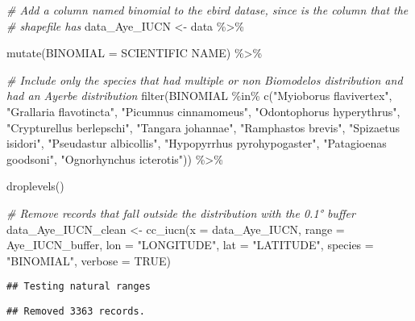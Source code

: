 \documentclass[
]{article}
\newenvironment{Shaded}{\begin{snugshade}}{\end{snugshade}}
\newcommand{\AttributeTok}[1]{\textcolor[rgb]{0.77,0.63,0.00}{#1}}
\newcommand{\CommentTok}[1]{\textcolor[rgb]{0.56,0.35,0.01}{\textit{#1}}}
\newcommand{\ConstantTok}[1]{\textcolor[rgb]{0.00,0.00,0.00}{#1}}
\newcommand{\FunctionTok}[1]{\textcolor[rgb]{0.00,0.00,0.00}{#1}}
\newcommand{\NormalTok}[1]{#1}
\newcommand{\OtherTok}[1]{\textcolor[rgb]{0.56,0.35,0.01}{#1}}
\newcommand{\SpecialCharTok}[1]{\textcolor[rgb]{0.00,0.00,0.00}{#1}}
\newcommand{\StringTok}[1]{\textcolor[rgb]{0.31,0.60,0.02}{#1}}
\begin{document}
\begin{Shaded}
\begin{Highlighting}[]
\CommentTok{\# Add a column named binomial to the ebird datase, since is the column that the }
\CommentTok{\# shapefile has }
\NormalTok{data\_Aye\_IUCN }\OtherTok{\textless{}{-}}\NormalTok{ data }\SpecialCharTok{\%\textgreater{}\%} 
  
  \FunctionTok{mutate}\NormalTok{(}\AttributeTok{BINOMIAL =} \StringTok{\textasciigrave{}}\AttributeTok{SCIENTIFIC NAME}\StringTok{\textasciigrave{}}\NormalTok{) }\SpecialCharTok{\%\textgreater{}\%}
  
  \CommentTok{\# Include only the species that had multiple or non Biomodelos distribution and had an Ayerbe distribution}
  \FunctionTok{filter}\NormalTok{(BINOMIAL }\SpecialCharTok{\%in\%} \FunctionTok{c}\NormalTok{(}\StringTok{"Myioborus flavivertex"}\NormalTok{, }\StringTok{"Grallaria flavotincta"}\NormalTok{, }\StringTok{"Picumnus cinnamomeus"}\NormalTok{, }\StringTok{"Odontophorus hyperythrus"}\NormalTok{, }\StringTok{"Crypturellus berlepschi"}\NormalTok{, }\StringTok{"Tangara johannae"}\NormalTok{, }\StringTok{"Ramphastos brevis"}\NormalTok{, }\StringTok{"Spizaetus isidori"}\NormalTok{, }\StringTok{"Pseudastur albicollis"}\NormalTok{, }\StringTok{"Hypopyrrhus pyrohypogaster"}\NormalTok{, }\StringTok{"Patagioenas goodsoni"}\NormalTok{, }\StringTok{"Ognorhynchus icterotis"}\NormalTok{)) }\SpecialCharTok{\%\textgreater{}\%}
  
  \FunctionTok{droplevels}\NormalTok{()}

\CommentTok{\# Remove records that fall outside the distribution with the 0.1° buffer }
\NormalTok{data\_Aye\_IUCN\_clean }\OtherTok{\textless{}{-}} \FunctionTok{cc\_iucn}\NormalTok{(}\AttributeTok{x =}\NormalTok{ data\_Aye\_IUCN, }
                \AttributeTok{range =}\NormalTok{ Aye\_IUCN\_buffer, }
                \AttributeTok{lon =} \StringTok{"LONGITUDE"}\NormalTok{, }
                \AttributeTok{lat =} \StringTok{"LATITUDE"}\NormalTok{,}
                \AttributeTok{species =} \StringTok{"BINOMIAL"}\NormalTok{,}
                \AttributeTok{verbose =} \ConstantTok{TRUE}\NormalTok{)}
\end{Highlighting}
\end{Shaded}

\begin{verbatim}
## Testing natural ranges
\end{verbatim}

\begin{verbatim}
## Removed 3363 records.
\end{verbatim}
\end{document}

